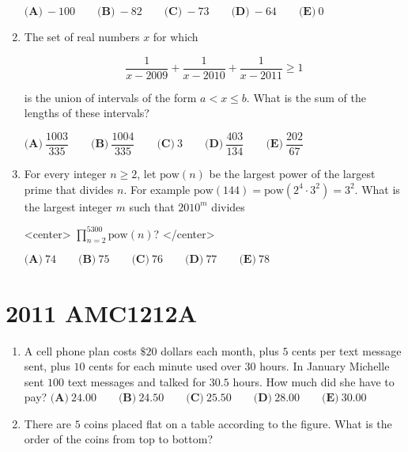 \documentclass{article}
\begin{document}
\begin{enumerate}[label=\arabic*., itemsep=0.5em]
\(\textbf{(A)}\ -100 \qquad \textbf{(B)}\ -82 \qquad \textbf{(C)}\ -73 \qquad \textbf{(D)}\ -64 \qquad \textbf{(E)}\ 0\)\par \vspace{0.5em}\item The set of real numbers \(x\) for which 


\begin{equation*}
\dfrac{1}{x-2009}+\dfrac{1}{x-2010}+\dfrac{1}{x-2011}\ge1
\end{equation*}


is the union of intervals of the form \(a<x\le b\). What is the sum of the lengths of these intervals?

\(\textbf{(A)}\ \dfrac{1003}{335} \qquad \textbf{(B)}\ \dfrac{1004}{335} \qquad \textbf{(C)}\ 3 \qquad \textbf{(D)}\ \dfrac{403}{134} \qquad \textbf{(E)}\ \dfrac{202}{67}\)\par \vspace{0.5em}\item For every integer \(n\ge2\), let \(\text{pow}(n)\) be the largest power of the largest prime that divides \(n\). For example \(\text{pow}(144)=\text{pow}(2^4\cdot3^2)=3^2\). What is the largest integer \(m\) such that \(2010^m\) divides

<center>
\(\prod_{n=2}^{5300}\text{pow}(n)\)?
</center>


\(\textbf{(A)}\ 74 \qquad \textbf{(B)}\ 75 \qquad \textbf{(C)}\ 76 \qquad \textbf{(D)}\ 77 \qquad \textbf{(E)}\ 78\)\par \vspace{0.5em}\end{enumerate}\newpage\section*{2011 AMC1212A}\begin{enumerate}[label=\arabic*., itemsep=0.5em]\item A cell phone plan costs \(\$20\) dollars each month, plus \(5\) cents per text message sent, plus \(10\) cents for each minute used over \(30\) hours. In January Michelle sent \(100\) text messages and talked for \(30.5\) hours. How much did she have to pay?
\(
\textbf{(A)}\ 24.00 \qquad
\textbf{(B)}\ 24.50 \qquad
\textbf{(C)}\ 25.50 \qquad
\textbf{(D)}\ 28.00 \qquad
\textbf{(E)}\ 30.00 \)\par \vspace{0.5em}\item There are \(5\) coins placed flat on a table according to the figure. What is the order of the coins from top to bottom?


\end{enumerate}
\end{document}
